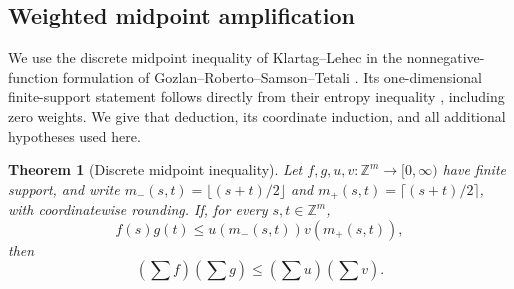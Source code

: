 \documentclass[11pt]{article}
\newcommand{\Z}{\mathbb Z}
\newtheorem{theorem}{Theorem}[section]
\theoremstyle{definition}
\theoremstyle{remark}
\numberwithin{equation}{section}
\begin{document}
\subsection{Weighted midpoint amplification}

We use the discrete midpoint inequality of Klartag--Lehec
\cite{KlartagLehec2019} in the nonnegative-function formulation of
Gozlan--Roberto--Samson--Tetali \cite[Theorem~3]{GRST2019}.  Its
one-dimensional finite-support statement follows directly from their
entropy inequality \cite[Theorem~8, equation~(9)]{GRST2019}, including
zero weights.  We give that deduction, its coordinate induction, and
all additional hypotheses used here.

\begin{theorem}[Discrete midpoint inequality]\label{thm:midpoint}
Let $f,g,u,v:\Z^m\longrightarrow[0,\infty)$ have finite support, and
write $m_-(s,t)=\lfloor(s+t)/2\rfloor$ and
$m_+(s,t)=\lceil(s+t)/2\rceil$, with coordinatewise rounding.
If, for every $s,t\in\Z^m$,
\[
 f(s)g(t)\leq u(m_-(s,t))v(m_+(s,t)),
\]
then
\[
 \left(\sum f\right)\left(\sum g\right)
 \leq\left(\sum u\right)\left(\sum v\right).
\]
\end{theorem}
\end{document}
